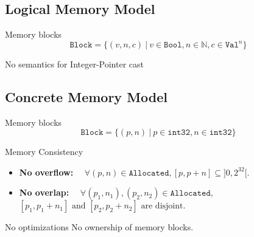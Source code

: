 \subsection{Logical Memory Model}
\begin{frame}{\subsecname}

  \begin{block}{Memory blocks}
    $$\texttt{Block}=\{(v,n,c)~|~v\in\texttt{Bool},n\in\mathbb{N},c\in\texttt{Val}^{n}\}$$
  \end{block}
  \vfill
  \vfill
  \begin{alertblock}{No semantics for Integer-Pointer cast}
  \end{alertblock}
  
\end{frame}

\subsection{Concrete Memory Model}
\begin{frame}{\subsecname}

  \begin{block}{Memory blocks}
    $$\texttt{Block}=\{(p,n)~|~p\in\texttt{int32},n\in\texttt{int32}\}$$
  \end{block}
  \vfill
  \begin{block}{Memory Consistency}
    \begin{itemize}
    \item \textbf{No overflow:} $\quad\forall (p,n)\in\texttt{Allocated}, [p,p+n]\subseteq]0,2^{32}[$.
      \item \textbf{No overlap:} $\quad\forall (p_1,n_1), (p_2,n_2)\in\texttt{Allocated},$\\ $[p_1,p_1+n_1]\text{ and }[p_2,p_2+n_2]\text{ are disjoint.}$
    \end{itemize}
  \end{block}
  \vfill
  \begin{alertblock}{No optimizations}
    No ownership of memory blocks.
  \end{alertblock}

\end{frame}

